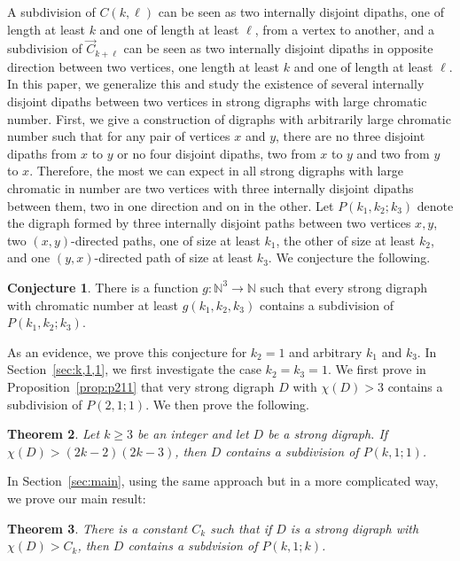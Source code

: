 \documentclass[utf8,10pt]{article}
\theoremstyle{plain}
\newtheorem{theorem}{Theorem}
\theoremstyle{definition}
\newtheorem{conjecture}[theorem]{Conjecture}
\theoremstyle{remark}
\begin{document}
A subdivision of $C(k,\ell)$ can be seen as two internally disjoint dipaths, one of length at least $k$ and one of length at least $\ell$, from a vertex to another, and a subdivision of $\vec{C}_{k+\ell}$ can be seen as two internally disjoint dipaths in opposite direction between two vertices, one length at least $k$ and one of length at least $\ell$.
In this paper, we generalize this and study the existence of several internally disjoint dipaths between two vertices in strong digraphs with large chromatic number.
First, we give a construction of digraphs with arbitrarily large chromatic number such that for any pair of vertices
$x$ and $y$, there are no three disjoint dipaths from $x$ to $y$ or no four disjoint dipaths, two from $x$ to $y$ and two from $y$ to $x$. 
Therefore, the most we can expect in all strong digraphs with large chromatic in number are two vertices with three internally disjoint dipaths between them, two in one direction and on in the other.
Let $P(k_1,k_2;k_3)$ denote the digraph formed by three internally disjoint paths between two vertices $x,y$,
two $(x,y)$-directed paths, one of size at least $k_1$, the other of size at least $k_2$, and one $(y,x)$-directed path of size at least $k_3$.
We conjecture the following.

\begin{conjecture}\label{conj:3chemins}
There is a function $g:\mathbb{N}^3 \rightarrow \mathbb{N}$ such that  every strong digraph with chromatic number at least $g(k_1,k_2,k_3)$ contains
a subdivision of $P(k_1,k_2;k_3)$.
\end{conjecture}

As an evidence, we prove this conjecture for $k_2=1$ and arbitrary $k_1$ and $k_3$. In Section~\ref{sec:k,1,1}, we first investigate the case $k_2=k_3=1$. We first prove in Proposition~\ref{prop:p211} that very strong digraph $D$ with $\chi(D)>3$ contains a subdivision of $P(2,1;1)$. We then prove the following.


\begin{theorem}\label{th:P11k}
Let $k \geq 3$ be an integer and let $D$ be a strong digraph. If $\chi(D) >  (2k-2)(2k-3)$, then $D$ contains a subdivision of $P(k,1;1)$.
\end{theorem}

In Section~\ref{sec:main}, using the same approach but in a more complicated way, we prove our main result: 

\begin{theorem}\label{th:main}
There is a constant $C_k$ such that if $D$ is a strong digraph with $\chi(D) > C_k$, then $D$ contains a subdvision of $P(k,1;k)$.
\end{theorem}
\end{document}
